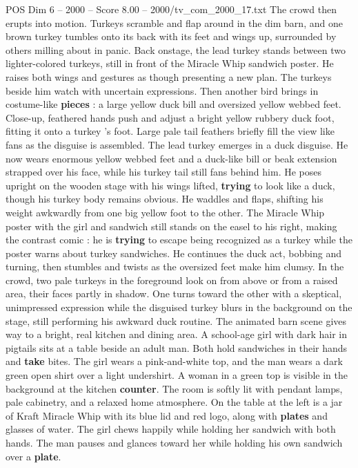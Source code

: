 \begin{textsample}{POS Dim 6 – 2000 – Score 8.00 – 2000/tv\_com\_2000\_17.txt}
The crowd then erupts into motion.
Turkeys scramble and flap around in the dim barn, and one brown turkey tumbles onto its back with its feet and wings up, surrounded by others milling about in panic.
Back onstage, the lead turkey stands between two lighter-colored turkeys, still in front of the Miracle Whip sandwich poster.
He raises both wings and gestures as though presenting a new plan.
The turkeys beside him watch with uncertain expressions.
Then another bird brings in costume-like \textbf{pieces} : a large yellow duck bill and oversized yellow webbed feet.
Close-up, feathered hands push and adjust a bright yellow rubbery duck foot, fitting it onto a turkey ’s foot.
Large pale tail feathers briefly fill the view like fans as the disguise is assembled.
The lead turkey emerges in a duck disguise.
He now wears enormous yellow webbed feet and a duck-like bill or beak extension strapped over his face, while his turkey tail still fans behind him.
He poses upright on the wooden stage with his wings lifted, \textbf{trying} to look like a duck, though his turkey body remains obvious.
He waddles and flaps, shifting his weight awkwardly from one big yellow foot to the other.
The Miracle Whip poster with the girl and sandwich still stands on the easel to his right, making the contrast comic : he is \textbf{trying} to escape being recognized as a turkey while the poster warns about turkey sandwiches.
He continues the duck act, bobbing and turning, then stumbles and twists as the oversized feet make him clumsy.
In the crowd, two pale turkeys in the foreground look on from above or from a raised area, their faces partly in shadow.
One turns toward the other with a skeptical, unimpressed expression while the disguised turkey blurs in the background on the stage, still performing his awkward duck routine.
The animated barn scene gives way to a bright, real kitchen and dining area.
A school-age girl with dark hair in pigtails sits at a table beside an adult man.
Both hold sandwiches in their hands and \textbf{take} bites.
The girl wears a pink-and-white top, and the man wears a dark green open shirt over a light undershirt.
A woman in a green top is visible in the background at the kitchen \textbf{counter}.
The room is softly lit with pendant lamps, pale cabinetry, and a relaxed home atmosphere.
On the table at the left is a jar of Kraft Miracle Whip with its blue lid and red logo, along with \textbf{plates} and glasses of water.
The girl chews happily while holding her sandwich with both hands.
The man pauses and glances toward her while holding his own sandwich over a \textbf{plate}.

\end{textsample}
